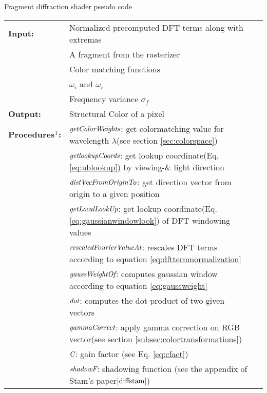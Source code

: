 \begin{algorithm}[H]
  \caption{Fragment diffraction shader pseudo code}
  \begin{table}[H]
    \begin{tabular}{@{}lll@{}}
      \textbf{Input:} & Normalized precomputed DFT terms along with extremas \\
      & A fragment from the rasterizer \\
      & Color matching functions \\
      & $\omega_i$ and $\omega_r$  \\
      & Frequency variance $\sigma_f$ \\
      \textbf{Output:} & Structural Color of a pixel \\
      \textbf{Procedures$\footnotemark$:} & $\emph{getColorWeights}$: get colormatching value for wavelength $\lambda$(see section \ref{sec:colorspace})\\
      & $\emph{getlookupCoords}$: get lookup coordinate(Eq.\ref{eq:ublookup}) by viewing-\& light direction \\
      & $\emph{distVecFromOriginTo}$: get direction vector from origin to a given position \\
      & $\emph{getLocalLookUp}$: get lookup coordinate(Eq.\ref{eq:gaussianwindowlook}) of DFT windowing values \\
      & $\emph{rescaledFourierValueAt}$: rescales DFT terms according to equation \ref{eq:dfttermnormalization}\\
      & $\emph{gaussWeightOf}$: computes gaussian window according to equation \ref{eq:gaussweight} \\
      & $\emph{dot}$: computes the dot-product of two given vectors \\
      & $\emph{gammaCorrect}$: apply gamma correction on RGB vector(see section \ref{subsec:colortransformations}) \\ 
      & $\emph{C}$: gain factor (see Eq. \ref{eq:cfact}) \\  
      & $\emph{shadowF}$: shadowing function (see the appendix of Stam's paper$\cite{diffstam}$) \\   
    \end{tabular} 
  \end{table}
  

\end{algorithm}
